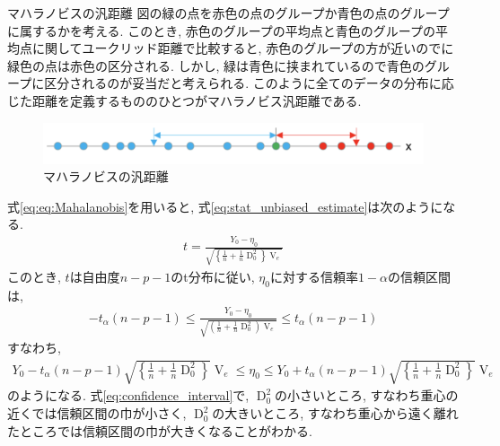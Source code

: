 \begin{itembox}[l]{マハラノビスの汎距離}
  \quad 図の緑の点を赤色の点のグループか青色の点のグループに属するかを考える. このとき, 赤色のグループの平均点と青色のグループの平均点に関してユークリッド距離で比較すると, 赤色のグループの方が近いのでに緑色の点は赤色の区分される. しかし, 緑は青色に挟まれているので青色のグループに区分されるのが妥当だと考えられる. このように全てのデータの分布に応じた距離を定義するもののひとつがマハラノビス汎距離である.
\end{itembox}

\begin{figure}[htb]
  \centering
  \includegraphics[width=14cm]{../pics/mahara.png}
  \caption{マハラノビスの汎距離}
  \label{fig:mahalanobis}
\end{figure}

式\eqref{eq:eq:Mahalanobis}を用いると, 式\eqref{eq:stat_unbiased_estimate}は次のようになる. 
\begin{align}
  \label{eq:stat_ve}
  t
  = \frac{Y_0-\eta_0}
  {\sqrt{\left\{
    \frac{1}{n} + \frac{1}{n}\operatorname{D}_0^2
  \right\}\operatorname{V}_e}}
\end{align}
このとき, $t$は自由度$n-p-1$のt分布に従い, $\eta_0$に対する信頼率$1-\alpha$の信頼区間は, 
\begin{align*}
  -t_{\alpha}(n-p-1) \leq
  \frac{Y_0-\eta_0}
  {\sqrt{\left(
    \frac{1}{n} + \frac{1}{n}\operatorname{D}_0^2
  \right)\operatorname{V}_e}}
  \leq t_{\alpha}(n-p-1)
\end{align*}
すなわち, 
\begin{align}
  \label{eq:confidence_interval}
  Y_0-t_{\alpha}(n-p-1)\sqrt{\left\{
    \frac{1}{n} + \frac{1}{n}\operatorname{D}_0^2
  \right\}}\operatorname{V}_e 
  \leq \eta_0
  \leq Y_0 + t_{\alpha}(n-p-1)\sqrt{\left\{
    \frac{1}{n} + \frac{1}{n}\operatorname{D}_0^2
  \right\}}\operatorname{V}_e 
\end{align}
のようになる. 式\eqref{eq:confidence_interval}で, $\operatorname{D}_0^2$の小さいところ, すなわち重心の近くでは信頼区間の巾が小さく, $\operatorname{D}_0^2$の大きいところ, すなわち重心から遠く離れたところでは信頼区間の巾が大きくなることがわかる.  \\

